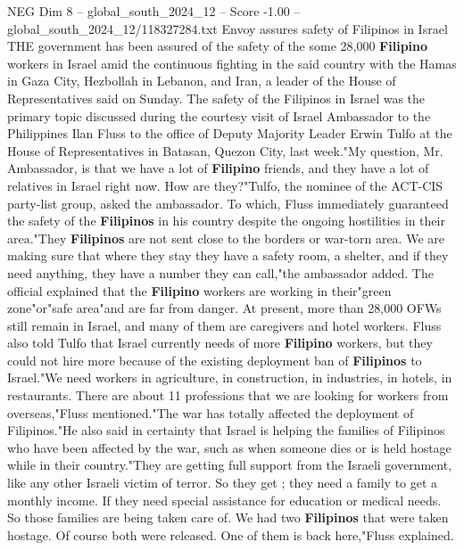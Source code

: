 \begin{textsample}{NEG Dim 8 – global\_south\_2024\_12 – Score -1.00 – global\_south\_2024\_12/118327284.txt}  \label{ex:f8_neg_381}
Envoy assures safety of Filipinos in Israel THE government has been assured of the safety of the some 28,000 \textbf{Filipino} workers in Israel amid the continuous fighting in the said country with the Hamas in Gaza City, Hezbollah in Lebanon, and Iran, a leader of the House of Representatives said on Sunday.
The safety of the Filipinos in Israel was the primary topic discussed during the courtesy visit of Israel Ambassador to the Philippines Ilan Fluss to the office of Deputy Majority Leader Erwin Tulfo at the House of Representatives in Batasan, Quezon City, last week."My question, Mr.
Ambassador, is that we have a lot of \textbf{Filipino} friends, and they have a lot of relatives in Israel right now.
How are they?"Tulfo, the nominee of the ACT-CIS party-list group, asked the ambassador.
To which, Fluss immediately guaranteed the safety of the \textbf{Filipinos} in his country despite the ongoing hostilities in their area."They \textbf{Filipinos} are not sent close to the borders or war-torn area.
We are making sure that where they stay they have a safety room, a shelter, and if they need anything, they have a number they can call,"the ambassador added.
The official explained that the \textbf{Filipino} workers are working in their"green zone"or"safe area"and are far from danger.
At present, more than 28,000 OFWs still remain in Israel, and many of them are caregivers and hotel workers.
Fluss also told Tulfo that Israel currently needs of more \textbf{Filipino} workers, but they could not hire more because of the existing deployment ban of \textbf{Filipinos} to Israel."We need workers in agriculture, in construction, in industries, in hotels, in restaurants.
There are about 11 professions that we are looking for workers from overseas,"Fluss mentioned."The war has totally affected the deployment of Filipinos."He also said in certainty that Israel is helping the families of Filipinos who have been affected by the war, such as when someone dies or is held hostage while in their country."They are getting full support from the Israeli government, like any other Israeli victim of terror.
So they get ; they need a family to get a monthly income.
If they need special assistance for education or medical needs.
So those families are being taken care of.
We had two \textbf{Filipinos} that were taken hostage.
Of course both were released.
One of them is back here,"Fluss explained.

\end{textsample}
